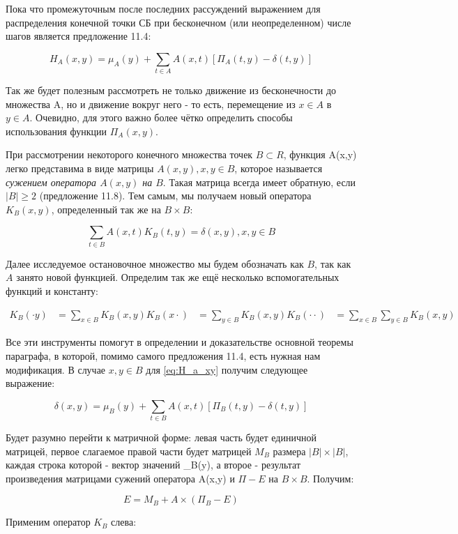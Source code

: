 Пока что промежуточным после последних рассуждений выражением для распределения конечной точки СБ при бесконечном (или неопределенном) числе шагов является предложение 11.4:

\begin{equation}
 H_A(x,y) = \mu_A(y) + \sum_{t \in A} A(x,t)[\Pi_A(t,y)-\delta(t,y)]
 \label{eq:H_a_xy}
\end{equation}

Так же будет полезным рассмотреть не только движение из бесконечности до множества A, но и движение вокруг него - то есть, перемещение 
из $x \in A$ в $y \in A$. Очевидно, для этого важно более чётко определить способы использования функции $\Pi_A(x,y)$.

При рассмотрении некоторого конечного множества точек $B \subset R$, функция A(x,y) легко представима в виде матрицы ${A(x,y)}, x,y \in B$, которое называется 
\textit{сужением оператора $A(x,y)$ на $B$}. Такая матрица всегда имеет обратную, если $|B| \geq 2$ (предложение 11.8). Тем самым, мы получаем новый оператора
$K_B(x,y)$, определенный так же на $B \times B$:

\[ \sum_{t \in B} A(x,t) K_B(t,y) = \delta(x,y), x,y \in B \]

Далее исследуемое остановочное множество мы будем обозначать как $B$, так как $A$ занято новой функцией.
Определим так же ещё несколько вспомогательных функций и константу:

\begin{align*} 
K_B(\cdot y) &= \sum_{x \in B} K_B(x,y)
K_B(x \cdot) &= \sum_{y \in B} K_B(x,y)
K_B(\cdot \cdot) &= \sum_{x \in B} \sum_{y \in B} K_B(x,y)
\end{align*}

Все эти инструменты помогут в определении и доказательстве основной теоремы параграфа, в которой, помимо самого предложения 11.4, есть нужная нам модификация.
В случае $x,y \in B$ для \ref{eq:H_a_xy} получим следующее выражение:

\[ \delta(x,y) = \mu_B(y) + \sum_{t \in B} A(x,t)[\Pi_B(t,y)-\delta(t,y)] \] 

Будет разумно перейти к матричной форме: левая часть будет единичной матрицей, первое слагаемое правой части будет матрицей $M_B$ размера $|B| \times |B|$, 
каждая строка которой - вектор значений \mu_B(y), а второе - результат произведения матрицами сужений оператора A(x,y) и $\Pi - E$ на $B \times B$. Получим:

\[ E = M_B + A \times (\Pi_B - E) \]

Применим оператор $K_B$ слева:


